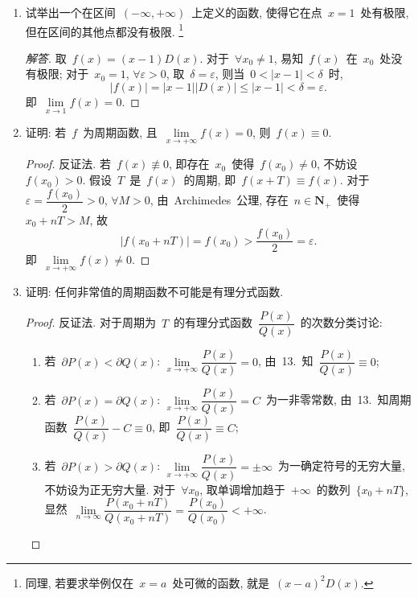 \documentclass[UTF8,a4paper,11pt,twoside]{book}
\begin{document}
\begin{enumerate}
	      \begin{proof}[方法三]
		      $\forall x_0\in(-\infty,+\infty)$, 由于有理数集~$\mathbf{Q}$~和无理数集~$\mathbf{Q}^{C}$~均在~$\mathbf{R}$~中稠密, 取有理数列~$\{\xi_n\}$~和无理数列~$\{\eta\}$~使得~$\lim\limits_{n\to\infty} \xi_n=\lim\limits_{n\to\infty} \eta_n=x_0$. 但~$\lim\limits_{n\to\infty} D(\xi_n)=1\neq 0=\lim\limits_{n\to\infty} \eta_n$. 由~Heine~定理知~$D(x)$~在~$\forall x_0\in(-\infty,+\infty)$~都没有极限. \qedhere
	      \end{proof}

	\item 试举出一个在区间~$(-\infty,+\infty)$~上定义的函数, 使得它在点~$x=1$~处有极限, 但在区间的其他点都没有极限. \footnote{同理, 若要求举例仅在~$x=a$~处可微的函数, 就是~$(x-a)^2D(x)$.}
	      \begin{proof}[解答]
		      取~$f(x)=(x-1)D(x)$. 对于~$\forall x_0\neq 1$, 易知~$f(x)$~在~$x_0$~处没有极限; 对于~$x_0=1$, $\forall\varepsilon>0$, 取~$\delta=\varepsilon$, 则当~$0<|x-1|<\delta$~时,
		      \[
			      |f(x)|=|x-1||D(x)|\leqslant |x-1|<\delta=\varepsilon.
		      \]
		      即~$\lim\limits_{x\to 1} f(x)=0$. \qedhere
	      \end{proof}

	\item 证明: 若~$f$~为周期函数, 且~$\lim\limits_{x\to+\infty} f(x)=0$, 则~$f(x)\equiv 0$.
	      \begin{proof}
		      反证法. 若~$f(x)\not\equiv 0$, 即存在~$x_0$~使得~$f(x_0)\neq 0$, 不妨设~$f(x_0)>0$. 假设~$T$~是~$f(x)$~的周期, 即~$f(x+T)\equiv f(x)$. 对于~$\varepsilon=\dfrac{f(x_0)}{2}>0$, $\forall M>0$, 由~Archimedes~公理, 存在~$n\in\mathbf{N}_{+}$~使得~$x_0+nT>M$, 故
		      \[
			      |f(x_0+nT)|=f(x_0)>\dfrac{f(x_0)}{2}=\varepsilon.
		      \]
		      即~$\lim\limits_{x\to+\infty} f(x)\neq 0$. \qedhere
	      \end{proof}

	\item 证明: 任何非常值的周期函数不可能是有理分式函数.
	      \begin{proof}
		      反证法. 对于周期为~$T$~的有理分式函数~$\dfrac{P(x)}{Q(x)}$~的次数分类讨论:
		      \begin{enumerate}[(1)]
			      \item 若~$\partial P(x)<\partial Q(x)$: $\lim\limits_{x\to+\infty} \dfrac{P(x)}{Q(x)}=0$, 由~13.~知~$\dfrac{P(x)}{Q(x)}\equiv 0$;
			      \item 若~$\partial P(x)=\partial Q(x)$: $\lim\limits_{x\to+\infty} \dfrac{P(x)}{Q(x)}=C$~为一非零常数, 由~13.~知周期函数~$\dfrac{P(x)}{Q(x)}-C\equiv 0$, 即~$\dfrac{P(x)}{Q(x)}\equiv C$;
			      \item 若~$\partial P(x)>\partial Q(x)$: $\lim\limits_{x\to+\infty} \dfrac{P(x)}{Q(x)}=\pm\infty$~为一确定符号的无穷大量, 不妨设为正无穷大量. 对于~$\forall x_0$, 取单调增加趋于~$+\infty$~的数列~$\{x_0+nT\}$, 显然~$\lim\limits_{n\to\infty} \dfrac{P(x_0+nT)}{Q(x_0+nT)}=\dfrac{P(x_0)}{Q(x_0)}<+\infty$. \qedhere
		      \end{enumerate}
	      \end{proof}
\end{enumerate}
\end{document}
